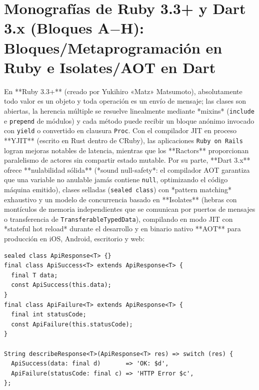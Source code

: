 \documentclass{book}
\begin{document}
\section{Monografías de Ruby 3.3+ y Dart 3.x (Bloques A\(-\)H): Bloques/Metaprogramación en Ruby e Isolates/AOT en Dart}

En **Ruby 3.3+** (creado por Yukihiro «Matz» Matsumoto), absolutamente todo valor es un objeto y toda operación es un envío de mensaje; las clases son abiertas, la herencia múltiple se resuelve linealmente mediante *mixins* (\texttt{include} e \texttt{prepend} de módulos) y cada método puede recibir un bloque anónimo invocado con \texttt{yield} o convertido en clausura \texttt{Proc}. Con el compilador JIT en proceso **YJIT** (escrito en Rust dentro de CRuby), las aplicaciones \texttt{Ruby on Rails} logran mejoras notables de latencia, mientras que los **Ractors** proporcionan paralelismo de actores sin compartir estado mutable. Por su parte, **Dart 3.x** ofrece **nulabilidad sólida** (*sound null-safety*: el compilador AOT garantiza que una variable no anulable jamás contiene \texttt{null}, optimizando el código máquina emitido), clases selladas (\texttt{sealed class}) con *pattern matching* exhaustivo y un modelo de concurrencia basado en **Isolates** (hebras con montículos de memoria independientes que se comunican por puertos de mensajes o transferencia de \texttt{TransferableTypedData}), compilando en modo JIT con *stateful hot reload* durante el desarrollo y en binario nativo **AOT** para producción en iOS, Android, escritorio y web:
\begin{lstlisting}[style=studium]
sealed class ApiResponse<T> {}
final class ApiSuccess<T> extends ApiResponse<T> {
  final T data;
  const ApiSuccess(this.data);
}
final class ApiFailure<T> extends ApiResponse<T> {
  final int statusCode;
  const ApiFailure(this.statusCode);
}

String describeResponse<T>(ApiResponse<T> res) => switch (res) {
  ApiSuccess(data: final d)       => 'OK: $d',
  ApiFailure(statusCode: final c) => 'HTTP Error $c',
};
\end{lstlisting}
\end{document}
